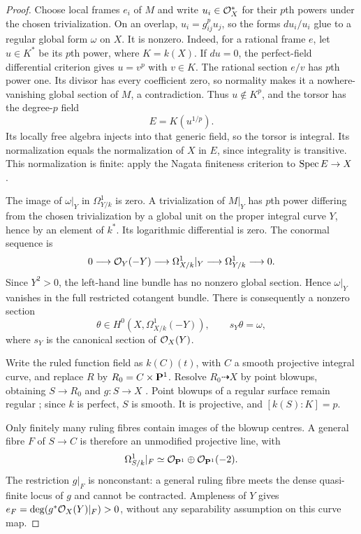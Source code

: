 \begin{proof}
Choose local frames $e_i$ of $M$ and write $u_i\in\mathcal O_X^*$
for their $p$th powers under the chosen trivialization.
On an overlap, $u_i=g_{ij}^p u_j$, so the forms $du_i/u_i$
glue to a regular global form $\omega$ on $X$.
It is nonzero. Indeed, for a rational frame $e$, let
$u\in K^*$ be its $p$th power, where $K=k(X)$.
If $du=0$, the perfect-field differential criterion
\cite[Tag~031W]{Stacks} gives $u=v^p$ with $v\in K$.
The rational section $e/v$ has $p$th power one.
Its divisor has every coefficient zero, so normality makes
it a nowhere-vanishing global section of $M$, a contradiction.
Thus $u\notin K^p$, and the torsor has the degree-$p$ field
\[
 E=K(u^{1/p}).
\]
Its locally free algebra injects into that generic field,
so the torsor is integral. Its normalization equals the
normalization of $X$ in $E$, since integrality is transitive.
This normalization is finite: apply the Nagata finiteness
criterion to $\operatorname{Spec} E\to X$
\cite[Lemma~29.54.14, Tag~0BAK]{Stacks}.

The image of $\omega|_Y$ in $\Omega^1_{Y/k}$ is zero.
A trivialization of $M|_Y$ has $p$th power differing from
the chosen trivialization by a global unit on the proper
integral curve $Y$, hence by an element of $k^*$.
Its logarithmic differential is zero.
The conormal sequence is
\[
 0\longrightarrow\mathcal O_Y(-Y)\longrightarrow
 \Omega^1_{X/k}|_Y\longrightarrow\Omega^1_{Y/k}
 \longrightarrow0.
\]
Since $Y^2>0$, the left-hand line bundle has no nonzero
global section. Hence $\omega|_Y$ vanishes in the full
restricted cotangent bundle. There is consequently a
nonzero section
\[
 \theta\in H^0(X,\Omega^1_{X/k}(-Y)),
 \qquad s_Y\theta=\omega,
\]
where $s_Y$ is the canonical section of $\mathcal O_X(Y)$.

Write the ruled function field as $k(C)(t)$, with $C$ a
smooth projective integral curve, and replace $R$ by
$R_0=C\times\mathbf P^1$. Resolve $R_0\dashrightarrow X$ by
point blowups, obtaining $S\to R_0$ and $g:S\to X$
\cite[Tag~0C5H]{Stacks}. Point blowups of a regular surface
remain regular \cite[Lemma~54.3.2, Tag~0AGP]{Stacks}; since
$k$ is perfect, $S$ is smooth. It is projective, and
$[k(S):K]=p$.

Only finitely many ruling fibres contain images of the
blowup centres. A general fibre $F$ of $S\to C$ is therefore
an unmodified projective line, with
\[
 \Omega^1_{S/k}|_F\simeq\mathcal O_{\mathbf P^1}\oplus\mathcal O_{\mathbf P^1}(-2).
\]
The restriction $g|_F$ is nonconstant: a general ruling
fibre meets the dense quasi-finite locus of $g$ and cannot
be contracted. Ampleness of $Y$ gives
$e_F=\deg(g^*\mathcal O_X(Y)|_F)>0$, without any separability
assumption on this curve map.


\end{proof}
